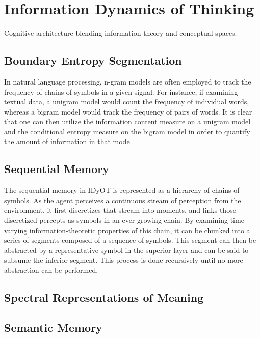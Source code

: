 \section{Information Dynamics of Thinking}
\label{section:idyot}

Cognitive architecture blending information theory and conceptual spaces.

\subsection{Boundary Entropy Segmentation}
\label{subsection:boundary-entropy-segmentation}

In natural language processing, n-gram models are often employed to track the frequency of chains of symbols in a given signal.  For instance, if examining textual data, a unigram model would count the frequency of individual words, whereas a bigram model would track the frequency of pairs of words.  It is clear that one can then utilize the information content measure on a unigram model and the conditional entropy measure on the bigram model in order to quantify the amount of information in that model. \cite{sproat1996stochastic}

\subsection{Sequential Memory}
\label{subsection:sequential-memory}

The sequential memory in IDyOT is represented as a hierarchy of chains of symbols. As the agent perceives a continuous stream of perception from the environment, it first discretizes that stream into moments, and links those discretized percepts as symbols in an ever-growing chain.  By examining time-varying information-theoretic properties of this chain, it can be chunked into a series of segments composed of a sequence of symbols.  This segment can then be abstracted by a representative symbol in the superior layer and can be said to subsume the inferior segment.  This process is done recursively until no more abstraction can be performed.

\subsection{Spectral Representations of Meaning}
\label{subsection:semantic-spectral-representation}

\subsection{Semantic Memory}
\label{subsection:semantic-memory}

